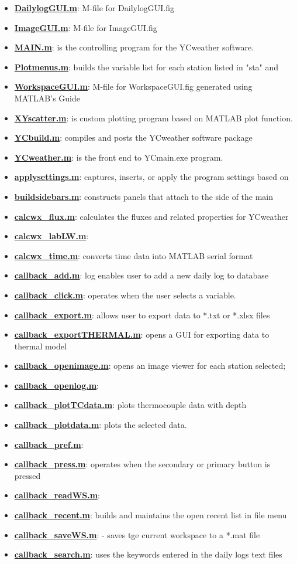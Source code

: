 \newcommand{\MATLABitem}[2]{\item \hyperref[mfile:#1]{\bfseries #2}: \label{mlist:#1}}
\newcommand{\MATLABsubitem}[1]{\item{\bfseries #1}: }
\begin{itemize}[itemsep=0pt]
    \MATLABitem{DailylogGUI}{DailylogGUI.m} M-file for DailylogGUI.fig
    \MATLABitem{ImageGUI}{ImageGUI.m} M-file for ImageGUI.fig
    \MATLABitem{MAIN}{MAIN.m} is the controlling program for the YCweather software.
    \MATLABitem{Plotmenus}{Plotmenus.m} builds the variable list for each station listed in "sta" and
    \MATLABitem{WorkspaceGUI}{WorkspaceGUI.m} M-file for WorkspaceGUI.fig generated using MATLAB's Guide
    \MATLABitem{XYscatter}{XYscatter.m} is custom plotting program based on MATLAB plot function.
    \MATLABitem{YCbuild}{YCbuild.m} compiles and posts the YCweather software package
    \MATLABitem{YCweather}{YCweather.m} is the front end to YCmain.exe program.
    \MATLABitem{applysettings}{applysettings.m} captures, inserts, or apply the program settings based on
    \MATLABitem{buildsidebars}{buildsidebars.m} constructs panels that attach to the side of the main
    \MATLABitem{calcwxflux}{calcwx\_flux.m} calculates the fluxes and related properties for YCweather
    \MATLABitem{calcwxlabLW}{calcwx\_labLW.m} 
    \MATLABitem{calcwxtime}{calcwx\_time.m} converts time data into MATLAB serial format
    \MATLABitem{callbackadd}{callback\_add.m} log enables user to add a new daily log to database
    \MATLABitem{callbackclick}{callback\_click.m} operates when the user selects a variable.
    \MATLABitem{callbackexport}{callback\_export.m} allows user to export data to *.txt or *.xlsx files
    \MATLABitem{callbackexportTHERMAL}{callback\_exportTHERMAL.m} opens a GUI for exporting data to thermal model
    \MATLABitem{callbackopenimage}{callback\_openimage.m} opens an image viewer for each station selected;
    \MATLABitem{callbackopenlog}{callback\_openlog.m} 
    \MATLABitem{callbackplotTCdata}{callback\_plotTCdata.m} plots thermocouple data with depth
    \MATLABitem{callbackplotdata}{callback\_plotdata.m} plots the selected data.
    \MATLABitem{callbackpref}{callback\_pref.m} 
    \MATLABitem{callbackpress}{callback\_press.m} operates when the secondary or primary button is pressed
    \MATLABitem{callbackreadWS}{callback\_readWS.m} 
    \MATLABitem{callbackrecent}{callback\_recent.m} builds and maintains the open recent list in file menu
    \MATLABitem{callbacksaveWS}{callback\_saveWS.m} - saves tge current workspace to a *.mat file
    \MATLABitem{callbacksearch}{callback\_search.m} uses the keywords entered in the daily logs text files

\end{itemize}
